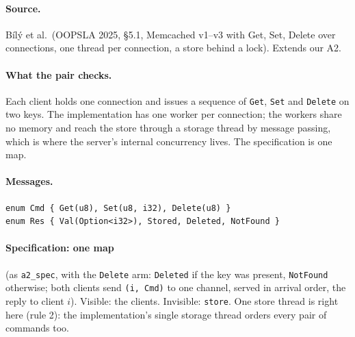 \documentclass[11pt,a4paper]{article}
\newcommand{\code}[1]{\texttt{#1}}
\begin{document}
\paragraph{Source.} B\'il\'y et al.\ (OOPSLA 2025, \S5.1, Memcached v1--v3 with Get, Set,
Delete over connections, one thread per connection, a store behind a lock). Extends our A2.

\paragraph{What the pair checks.} Each client holds one connection and issues a sequence of
\code{Get}, \code{Set} and \code{Delete} on two keys. The implementation has one worker per
connection; the workers share no memory and reach the store through a storage thread by message
passing, which is where the server's internal concurrency lives. The specification is one map.

\paragraph{Messages.}
\begin{lstlisting}
enum Cmd { Get(u8), Set(u8, i32), Delete(u8) }
enum Res { Val(Option<i32>), Stored, Deleted, NotFound }
\end{lstlisting}

\paragraph{Specification: one map} (as \code{a2\_spec}, with the \code{Delete} arm:
\code{Deleted} if the key was present, \code{NotFound} otherwise; both clients send
\code{(i, Cmd)} to one channel, served in arrival order, the reply to client $i$). Visible: the
clients. Invisible: \code{store}. One store thread is right here (rule 2): the implementation's
single storage thread orders every pair of commands too.
\end{document}
